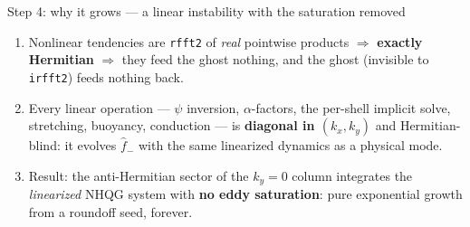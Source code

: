 \documentclass[aspectratio=169,10pt]{beamer}
\begin{document}
\begin{frame}{Step 4: why it grows --- a linear instability with the saturation removed}
  \begin{center}
  \end{center}
  \begin{enumerate}
    \item Nonlinear tendencies are \texttt{rfft2} of \emph{real} pointwise products
      $\Rightarrow$ \textbf{exactly Hermitian} $\Rightarrow$ they feed the ghost nothing,
      and the ghost (invisible to \texttt{irfft2}) feeds nothing back.
    \item Every linear operation --- $\psi$ inversion, $\alpha$-factors, the per-shell
      implicit solve, stretching, buoyancy, conduction --- is \textbf{diagonal in
      $(k_x,k_y)$} and Hermitian-blind: it evolves $\hat f_{-}$ with the same
      linearized dynamics as a physical mode.
    \item Result: the anti-Hermitian sector of the $k_y{=}0$ column integrates the
      \emph{linearized} NHQG system with \textbf{no eddy saturation}: pure exponential
      growth from a roundoff seed, forever.
  \end{enumerate}
\end{frame}
\end{document}
